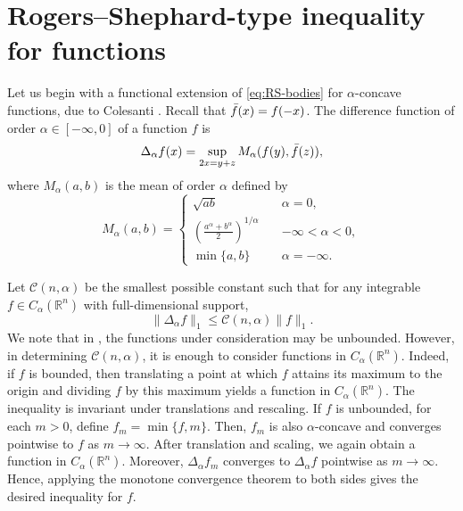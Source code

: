 \documentclass[11pt]{amsart}
\newcommand{\R}{{\mathbb R}}
\theoremstyle{plain}
\theoremstyle{definition}
\theoremstyle{remark}
\begin{document}
\section{Rogers--Shephard-type inequality for functions} \label{sec:RS}

Let us begin with a functional extension of \eqref{eq:RS-bodies} for $\alpha$-concave functions, due to Colesanti \cite{C-06}. Recall that $\Bar{f} (x) = f(-x)$. The difference function of order $\alpha \in [-\infty,0]$ of a function $f$ is
\begin{equation}
    \label{df:alpha-sum-Colestanti}
    \Delta_\alpha f(x) = \sup_{2x = y+z} M_\alpha (f(y),\Bar f(z)),
\end{equation}
where $M_\alpha (a,b)$ is the mean of order $\alpha$ defined by
\[
     M_\alpha (a,b) =
     \begin{cases}
        \sqrt{ab} \quad & \alpha = 0,
        \\
        \left(\frac{a^\alpha+b^\alpha}{2} \right)^{1/\alpha} \quad & -\infty <\alpha < 0,
        \\
        \min\{a,b\} \quad& \alpha = -\infty.
     \end{cases}
\]

Let $\mathcal{C} (n,\alpha)$ be the smallest possible constant such that for any integrable  $f \in C_\alpha (\R^n)$ with full-dimensional support,
\begin{equation}
    \label{const:alpha-sum-Colestanti}
    \| \Delta_\alpha f \|_1 \leq \mathcal{C} (n,\alpha)\|f\|_1.
\end{equation}
We note that in \cite{C-06}, the functions under consideration may be unbounded. However, in determining $\mathcal{C}(n, \alpha)$, it is enough to consider functions in $C_\alpha\left(\mathbb{R}^n\right)$. Indeed, if $f$ is bounded, then translating a point at which $f$ attains its maximum to the origin and dividing $f$ by this maximum yields a function in $C_\alpha\left(\mathbb{R}^n\right)$. The inequality is invariant under translations and rescaling.
If $f$ is unbounded, for each $m>0$, define $f_m=\min \{f, m\}.$ Then, $f_m$ is also $\alpha$-concave and converges pointwise to $f$ as $m \to \infty$. After translation and scaling, we again obtain a function in $C_\alpha (\R^n)$. Moreover, $\Delta_\alpha f_m $ converges to $ \Delta_\alpha f$ pointwise as $m \to \infty$. Hence, applying the monotone convergence theorem to both sides gives the desired inequality for $f$.
\end{document}

